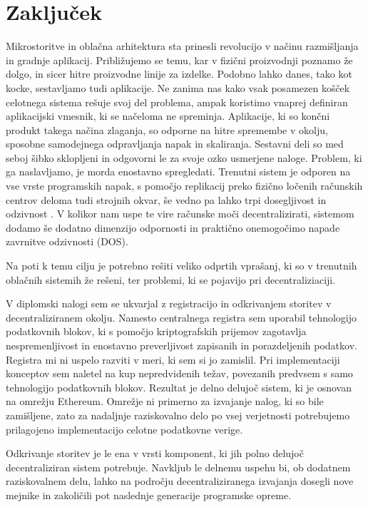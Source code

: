 \documentclass[a4paper, 12pt]{book}
\begin{document}
\chapter{Zaključek}
\label{stroka}

Mikrostoritve in oblačna arhitektura sta prinesli revolucijo v načinu razmišljanja in gradnje aplikacij.
Približujemo se temu, kar v fizični proizvodnji poznamo že dolgo, in sicer hitre proizvodne linije za izdelke.
Podobno lahko danes, tako kot kocke, sestavljamo tudi aplikacije.
Ne zanima nas kako vsak posamezen košček celotnega sistema rešuje svoj del problema, ampak koristimo vnaprej definiran aplikacijski vmesnik, ki se načeloma ne spreminja.
Aplikacije, ki so končni produkt takega načina zlaganja, so odporne na hitre spremembe v okolju, sposobne samodejnega odpravljanja napak in skaliranja.
Sestavni deli so med seboj šibko sklopljeni in odgovorni le za svoje ozko usmerjene naloge.
Problem, ki ga naslavljamo, je morda enostavno spregledati.
Trenutni sistem je odporen na vse vrste programskih napak, s pomočjo replikacij preko fizično ločenih računskih centrov deloma tudi strojnih okvar, še vedno pa lahko trpi dosegljivost in odzivnost \cite{awsFail}.
V kolikor nam uspe te vire računske moči decentralizirati, sistemom dodamo še dodatno dimenzijo odpornosti in praktično onemogočimo napade zavrnitve odzivnosti (DOS).

Na poti k temu cilju je potrebno rešiti veliko odprtih vprašanj, ki so v trenutnih oblačnih sistemih že rešeni, ter problemi, ki se pojavijo pri decentraliziaciji.

V diplomski nalogi sem se ukvarjal z registracijo in odkrivanjem storitev v decentraliziranem okolju.
Namesto centralnega registra sem uporabil tehnologijo podatkovnih blokov, ki s pomočjo kriptografskih prijemov zagotavlja nespremenljivost in enostavno preverljivost zapisanih in porazdeljenih podatkov.
Registra mi ni uspelo razviti v meri, ki sem si jo zamislil.
Pri implementaciji konceptov sem naletel na kup nepredvidenih težav, povezanih predvsem s samo tehnologijo podatkovnih blokov.
Rezultat je delno delujoč sistem, ki je osnovan na omrežju Ethereum.
Omrežje ni primerno za izvajanje nalog, ki so bile zamišljene, zato za nadaljnje raziskovalno delo po vsej verjetnosti potrebujemo prilagojeno implementacijo celotne podatkovne verige.

Odkrivanje storitev je le ena v vrsti komponent, ki jih polno delujoč decentraliziran sistem potrebuje.
Navkljub le delnemu uspehu bi, ob dodatnem raziskovalnem delu, lahko na področju decentraliziranega izvajanja dosegli nove mejnike in zakoličili pot naslednje generacije programske opreme.



\newpage %
\ \\
\clearpage
{}


\end{document}
